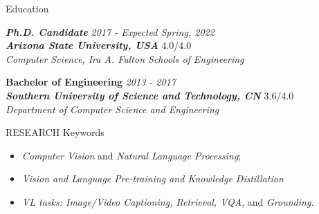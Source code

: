\documentclass{resume} %
\begin{document}

\begin{rSection}{Education}

\textit{{\bf Ph.D. Candidate }} \hfill {\em 2017 - Expected Spring, 2022} 
\\
{\textit{\bf Arizona State University, USA}} \hfill 4.0/4.0
\\ \textit{Computer Science, Ira A. Fulton Schools of Engineering
}


{\bf Bachelor of Engineering} \hfill {\em 2013 - 2017} 
\\  \textit{\bf Southern University of Science and Technology, CN} \hfill 3.6/4.0
\\ \textit{Department of Computer Science and Engineering}

\end{rSection}

\begin{rSection}{RESEARCH Keywords}
   \begin{itemize}
   \itemsep-0.4em 
    \item \textit{Computer Vision} and \textit{Natural Language Processing};
    \item \textit{Vision and Language Pre-training and Knowledge Distillation}
    \item \textit{VL tasks: Image/Video Captioning, Retrieval, VQA}, and \textit{Grounding.}

    \end{itemize}
\end{rSection}
\end{document}
